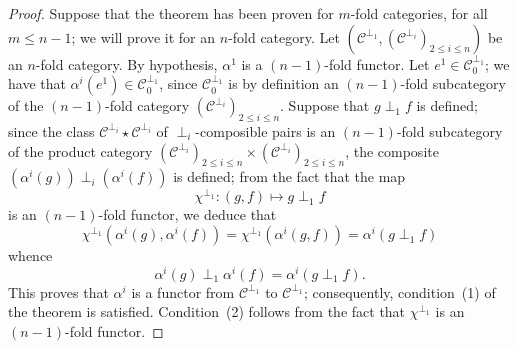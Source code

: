 \documentclass[a4paper,fleqn]{article}
\theoremstyle{plain}
\theoremstyle{definition}
\renewcommand{\leq}{\leqslant}
\newcommand{\oldpage}[1]{{\marginpar{\footnotesize$\bigg\vert$\,\,\,\,\textit{p.~#1}}}}
\newcommand{\CC}{\mathcal{C}}
\begin{document}
\begin{proof}
  Suppose that the theorem has been proven for $m$-fold categories, for all $m\leq n-1$; we will prove it for an $n$-fold category.
  Let $(\CC^{\perp_1},(\CC^{\perp_i})_{2\leq i\leq n})$ be an $n$-fold category.
  By hypothesis, $\alpha^1$ is a $(n-1)$-fold functor.
\oldpage{397}
  Let $e^1\in\CC_0^{\perp_1}$;
  we have that $\alpha^i(e^1)\in\CC_0^{\perp_1}$, since $\CC_0^{\perp_1}$ is by definition an $(n-1)$-fold subcategory of the $(n-1)$-fold category $(\CC^{\perp_i})_{2\leq i\leq n}$.
  Suppose that $g\perp_1 f$ is defined;
  since the class $\CC^{\perp_i}\star\CC^{\perp_i}$ of $\perp_i$-composible pairs is an $(n-1)$-fold subcategory of the product category $(\CC^{\perp_i})_{2\leq i\leq n}\times(\CC^{\perp_i})_{2\leq i\leq n}$, the composite $(\alpha^i(g))\perp_i(\alpha^i(f))$ is defined;
  from the fact that the map
  \[
    \chi^{\perp_1}
    \colon (g,f)
    \longmapsto g\perp_1f
  \]
  is an $(n-1)$-fold functor, we deduce that
  \[
    \chi^{\perp_1}(\alpha^i(g),\alpha^i(f))
    = \chi^{\perp_1}(\alpha^i(g,f))
    = \alpha^i(g\perp_1 f)
  \]
  whence
  \[
    \alpha^i(g)\perp_1\alpha^i(f)
    = \alpha^i(g\perp_1 f).
  \]
  This proves that $\alpha^i$ is a functor from $\CC^{\perp_1}$ to $\CC^{\perp_1}$;
  consequently, condition~(1) of the theorem is satisfied.
  Condition~(2) follows from the fact that $\chi^{\perp_1}$ is an $(n-1)$-fold functor.


\end{proof}
\end{document}
